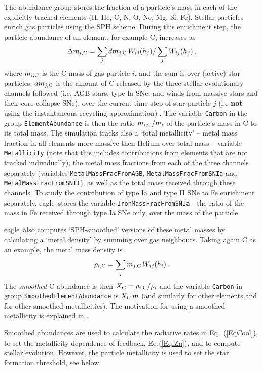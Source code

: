 \documentclass[10pt, a4paper]{article}
\newcommand{\eagle}{{\sc eagle}}
\begin{document}
The abundance group stores the fraction of a particle's mass in each of the explicitly tracked elements (H, He, C, N, O, Ne, Mg, Si, Fe). Stellar particles enrich gas particles using the SPH scheme. During this enrichment step, the particle abundance of an element, for example C, increases as \begin{equation} \Delta m_{i, {\rm C}} = \sum_j dm_{j, {\rm C}}\,W_{ij}(h_j)/ \sum_j W_{ij}(h_j)\,, \end{equation} where $m_{i, {\rm C}}$ is the C mass of gas particle $i$, and the sum is over (active) star particles. $dm_{j, {\rm C}}$ is the amount of C released by the three stellar evolutionary channels followed (i.e. AGB stars, type Ia SNe, and winds from massive stars and their core collapse SNe), over the current time step of star particle $j$ (i.e {\bf not} using the instantaneous recycling approximation) .  The variable \texttt{Carbon} in the group \texttt{ElementAbundance} is then the ratio $m_{i, {\rm C}}/m_i$ of the particle's mass in C to its total mass. The simulation tracks also a `total metallicity' -- metal mass fraction in all elements more massive then Helium over total mass -- variable \texttt{Metallicity} (note that this includes contributions from elements that are not tracked individually), the metal mass fractions from each of the three channels separately (variables \texttt{MetalMassFracFromAGB}, \texttt{MetalMassFracFromSNIa} and \texttt{MetalMassFracFromSNII}), as well as the total mass received through these channels. To study the contribution of type Ia and type II SNe to Fe enrichment separately, \eagle\ stores the variable \texttt{IronMassFracFromSNIa} - the ratio of the mass in Fe received through type Ia SNe only, over the mass of the particle.

\eagle\ also computes `SPH-smoothed' versions of these metal masses by calculating a `metal density' by summing over gas neighbours. Taking again C as an example, the metal mass density is \begin{equation} \rho_{i, {\rm C}} = \sum_j m_{j, {\rm C}}\,W_{ij}(h_i)\,.  \end{equation} The {\em smoothed} C abundance is then $X_{\rm C}=\rho_{i, {\rm C}}/\rho_i$ and the variable \texttt{Carbon} in group \texttt{SmoothedElementAbundance} is $X_{\rm C}\,m$ (and similarly for other elements and for other smoothed metallicities). The motivation for using a smoothed metallicity is explained in \cite{2009MNRAS.399..574W}.

Smoothed abundances are used to calculate the radiative rates in Eq.~(\ref{EqCool}), to set the metallicity dependence of feedback, Eq.(\ref{EqfZn}), and to compute stellar evolution. However, the particle metallicity is used to set the star formation threshold, see below.
\end{document}
